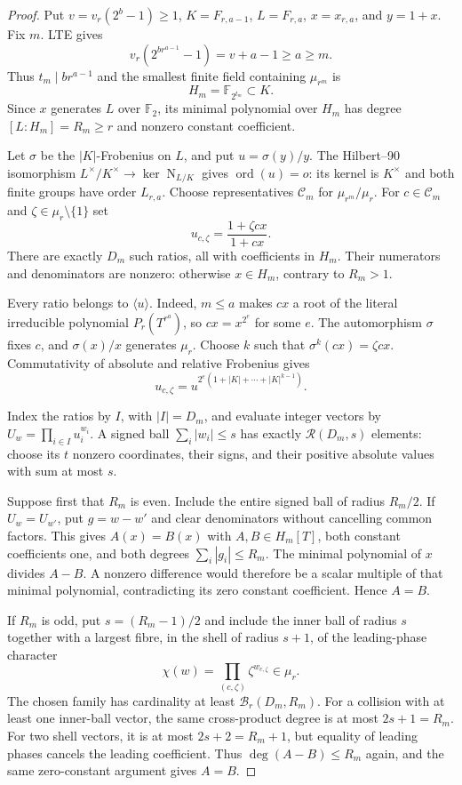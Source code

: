 \documentclass[11pt]{article}
\theoremstyle{definition}
\theoremstyle{remark}
\begin{document}
\begin{proof}
Put $v=v_r(2^b-1)\ge1$, $K=F_{r,a-1}$, $L=F_{r,a}$,
$x=x_{r,a}$, and $y=1+x$.  Fix $m$.  LTE gives
\[
 v_r(2^{br^{a-1}}-1)=v+a-1\ge a\ge m.
\]
Thus $t_m\mid br^{a-1}$ and the smallest finite field containing
$\mu_{r^m}$ is
\[
 H_m=\mathbb F_{2^{t_m}}\subset K.
\]
Since $x$ generates $L$ over $\mathbb F_2$, its minimal polynomial over
$H_m$ has degree $[L:H_m]=R_m\ge r$ and nonzero constant coefficient.

Let $\sigma$ be the $|K|$-Frobenius on $L$, and put $u=\sigma(y)/y$.
The Hilbert--90 isomorphism
$L^\times/K^\times\longrightarrow\ker\operatorname N_{L/K}$
gives $\operatorname{ord}(u)=o$: its kernel is $K^\times$ and both
finite groups have order $L_{r,a}$.
Choose representatives $\mathcal C_m$ for $\mu_{r^m}/\mu_r$.
For $c\in\mathcal C_m$ and $\zeta\in\mu_r\setminus\{1\}$ set
\[
 u_{c,\zeta}=\frac{1+\zeta cx}{1+cx}.
\]
There are exactly $D_m$ such ratios, all with coefficients in $H_m$.
Their numerators and denominators are nonzero: otherwise $x\in H_m$,
contrary to $R_m>1$.

Every ratio belongs to $\langle u\rangle$.  Indeed, $m\le a$ makes
$cx$ a root of the literal irreducible polynomial $P_r(T^{r^a})$,
so $cx=x^{2^e}$ for some $e$.  The automorphism $\sigma$ fixes $c$,
and $\sigma(x)/x$ generates $\mu_r$.  Choose $k$ such that
$\sigma^k(cx)=\zeta cx$.  Commutativity of absolute and relative
Frobenius gives
\[
 u_{c,\zeta}
 =u^{2^e(1+|K|+\cdots+|K|^{k-1})}.
\]

Index the ratios by $I$, with $|I|=D_m$, and evaluate integer vectors by
$U_w=\prod_{i\in I}u_i^{w_i}$.  A signed ball
$\sum_i|w_i|\le s$ has exactly $\mathcal R(D_m,s)$ elements:
choose its $t$ nonzero coordinates, their signs, and their positive
absolute values with sum at most $s$.

Suppose first that $R_m$ is even.  Include the entire signed ball of
radius $R_m/2$.  If $U_w=U_{w'}$, put $g=w-w'$ and clear denominators
without cancelling common factors.  This gives $A(x)=B(x)$ with
$A,B\in H_m[T]$, both constant coefficients one, and both degrees
$\sum_i|g_i|\le R_m$.
The minimal polynomial of $x$ divides $A-B$.  A nonzero difference
would therefore be a scalar multiple of that minimal polynomial,
contradicting its zero constant coefficient.  Hence $A=B$.

If $R_m$ is odd, put $s=(R_m-1)/2$ and include the inner ball of
radius $s$ together with a largest fibre, in the shell of radius $s+1$,
of the leading-phase character
\[
 \chi(w)=\prod_{(c,\zeta)}\zeta^{w_{c,\zeta}}\in\mu_r.
\]
The chosen family has cardinality at least $\mathcal B_r(D_m,R_m)$.
For a collision with at least one inner-ball vector, the same
cross-product degree is at most $2s+1=R_m$.  For two shell vectors,
it is at most $2s+2=R_m+1$, but equality of leading phases cancels
the leading coefficient.  Thus $\deg(A-B)\le R_m$ again, and the
same zero-constant argument gives $A=B$.


\end{proof}
\end{document}
